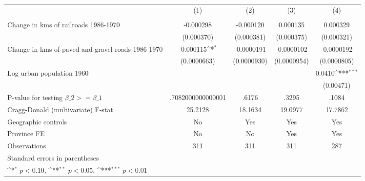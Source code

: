 {
\def\sym#1{\ifmmode^{#1}\else\(^{#1}\)\fi}
\begin{tabular}{l*{4}{c}}
\hline\hline
                &\multicolumn{1}{c}{(1)}&\multicolumn{1}{c}{(2)}&\multicolumn{1}{c}{(3)}&\multicolumn{1}{c}{(4)}\\
                &\multicolumn{1}{c}{}&\multicolumn{1}{c}{}&\multicolumn{1}{c}{}&\multicolumn{1}{c}{}\\
\hline
Change in kms of railroads 1986-1970&-0.000298         &-0.000120         & 0.000135         & 0.000329         \\
                &(0.000370)         &(0.000381)         &(0.000375)         &(0.000321)         \\
[1em]
Change in kms of paved and gravel roads 1986-1970&-0.000115\sym{*}  &-0.0000191         &-0.0000102         &-0.0000192         \\
                &(0.0000663)         &(0.0000930)         &(0.0000954)         &(0.0000805)         \\
[1em]
Log urban population 1960&                  &                  &                  &   0.0410\sym{***}\\
                &                  &                  &                  &(0.00471)         \\
\hline
P-value for testing $\beta\_{2} >= \beta\_{1}$&.7082000000000001         &    .6176         &    .3295         &    .1084         \\
Cragg-Donald (multivariate) F-stat&  25.2128         &  18.1634         &  19.0977         &  17.7862         \\
Geographic controls&       No         &      Yes         &      Yes         &      Yes         \\
Province FE     &       No         &       No         &      Yes         &      Yes         \\
Observations    &      311         &      311         &      311         &      287         \\
\hline\hline
\multicolumn{5}{l}{\footnotesize Standard errors in parentheses}\\
\multicolumn{5}{l}{\footnotesize \sym{*} \(p<0.10\), \sym{**} \(p<0.05\), \sym{***} \(p<0.01\)}\\
\end{tabular}
}
